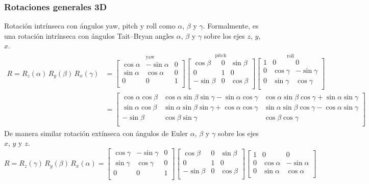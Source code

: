 \begin{frame}
    \frametitle{Rotaciones generales 3D}
    \tiny
    Rotación intrínseca con ángulos yaw, pitch y roll como $\alpha$, $\beta$ y $\gamma$. Formalmente, es una rotación intrínseca con ángulos Tait–Bryan angles $\alpha$, $\beta$ y $\gamma$ sobre los ejes $z$, $y$, $x$.
    \begin{equation*}
        {\displaystyle {\begin{aligned}R=R_{z}(\alpha )\,R_{y}(\beta )\,R_{x}(\gamma )&={\overset {\text{yaw}}{\begin{bmatrix}\cos \alpha &-\sin \alpha &0\\\sin \alpha &\cos \alpha &0\\0&0&1\\\end{bmatrix}}}{\overset {\text{pitch}}{\begin{bmatrix}\cos \beta &0&\sin \beta \\0&1&0\\-\sin \beta &0&\cos \beta \\\end{bmatrix}}}{\overset {\text{roll}}{\begin{bmatrix}1&0&0\\0&\cos \gamma &-\sin \gamma \\0&\sin \gamma &\cos \gamma \\\end{bmatrix}}}\\&={\begin{bmatrix}\cos \alpha \cos \beta &\cos \alpha \sin \beta \sin \gamma -\sin \alpha \cos \gamma &\cos \alpha \sin \beta \cos \gamma +\sin \alpha \sin \gamma \\\sin \alpha \cos \beta &\sin \alpha \sin \beta \sin \gamma +\cos \alpha \cos \gamma &\sin \alpha \sin \beta \cos \gamma -\cos \alpha \sin \gamma \\-\sin \beta &\cos \beta \sin \gamma &\cos \beta \cos \gamma \\\end{bmatrix}}\end{aligned}}}
    \end{equation*}
    De manera similar rotación extínseca con ángulos de Euler $\alpha$, $\beta$ y $\gamma$ sobre los ejes $x$, $y$ y $z$.
    \begin{equation*}
        {\displaystyle R=R_{z}(\gamma )\,R_{y}(\beta )\,R_{x}(\alpha )={\begin{bmatrix}\cos \gamma &-\sin \gamma &0\\\sin \gamma &\cos \gamma &0\\0&0&1\\\end{bmatrix}}{\begin{bmatrix}\cos \beta &0&\sin \beta \\0&1&0\\-\sin \beta &0&\cos \beta \\\end{bmatrix}}{\begin{bmatrix}1&0&0\\0&\cos \alpha &-\sin \alpha \\0&\sin \alpha &\cos \alpha \\\end{bmatrix}}}

\end{equation*}
\end{frame}
